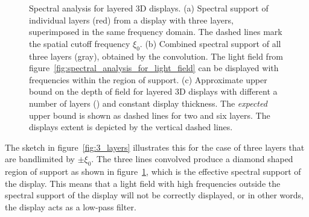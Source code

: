 \begin{figure}[tb]
	\begin{subfigure}[b]{.32\textwidth}
		\centering
		
		\caption{}
		\label{fig:3_layers}
		
		\vspace{0.5cm}
		
		
		\caption{}
		\label{fig:3_layes_convolution}
	\end{subfigure}%
	\hfill
	\begin{subfigure}[b]{.68\textwidth}
		\centering
		
		\caption{}
		\label{fig:cut-off-frequency_N_layers}
	\end{subfigure}%
	\caption[Spectral analysis for layered 3D displays]
			{Spectral analysis for layered 3D displays. 
			 (a) Spectral support of individual layers (red) from a display with three layers, superimposed in the same frequency domain.
				 The dashed lines mark the spatial cutoff frequency $\xi_0$.
			 (b) Combined spectral support of all three layers (gray), obtained by the convolution. 
				 The light field from figure~\ref{fig:spectral_analysis_for_light_field} can be displayed with frequencies within the region of support.
			 (c) Approximate upper bound on the depth of field for layered 3D displays with different a number of layers (\cite{WetzsteinTomo}) and constant display thickness.
				 The \emph{expected} upper bound is shown as dashed lines for two and six layers.
				 The displays extent is depicted by the vertical dashed lines.}
	\label{fig:spectral_analysis_of_display}
\end{figure}
The sketch in figure~\ref{fig:3_layers} illustrates this for the case of three layers that are bandlimited by $\pm \xi_0$.
The three lines convolved produce a diamond shaped region of support as shown in figure~\ref{fig:3_layes_convolution}, which is the effective spectral support of the display.
This means that a light field with high frequencies outside the spectral support of the display will not be correctly displayed, or in other words, the display acts as a low-pass filter.

